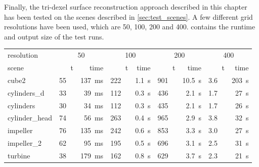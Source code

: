 Finally, the tri-dexel surface reconstruction approach described in this chapter has been tested on the scenes described in \cref{sec:test_scenes}.
A few different grid resolutions have been used, which are 50, 100, 200 and 400.
 contains the runtime and output size of the test runs.
%
\begin{table}
	\begin{subtable}{\textwidth}
		\centering
		\begin{tabular}{l|rr|rr|rr|rr}
			resolution     & \multicolumn{2}{c}{50} & \multicolumn{2}{c}{100} & \multicolumn{2}{c}{200} & \multicolumn{2}{c}{400} \\
			scene          & t\sub{out} & time & t\sub{out} & time & t\sub{out} & time & t\sub{out} & time \\
			\midrule
			cube2          & \SI{55}{\kilo\nothing} & \SI{137}{\milli\second} & \SI{222}{\kilo\nothing} & \SI{1.1}{\second} & \SI{901}{\kilo\nothing} & \SI{10.5}{\second} & \SI{3.6}{\mega\nothing} & \SI{203}{\second} \\
			cylinders\_d   & \SI{33}{\kilo\nothing} & \SI{ 39}{\milli\second} & \SI{112}{\kilo\nothing} & \SI{0.3}{\second} & \SI{436}{\kilo\nothing} & \SI{ 2.1}{\second} & \SI{1.7}{\mega\nothing} & \SI{ 27}{\second} \\
			cylinders      & \SI{30}{\kilo\nothing} & \SI{ 34}{\milli\second} & \SI{112}{\kilo\nothing} & \SI{0.3}{\second} & \SI{435}{\kilo\nothing} & \SI{ 2.1}{\second} & \SI{1.7}{\mega\nothing} & \SI{ 26}{\second} \\
			cylinder\_head & \SI{74}{\kilo\nothing} & \SI{ 56}{\milli\second} & \SI{263}{\kilo\nothing} & \SI{0.4}{\second} & \SI{965}{\kilo\nothing} & \SI{ 2.9}{\second} & \SI{3.8}{\mega\nothing} & \SI{ 32}{\second} \\
			impeller       & \SI{76}{\kilo\nothing} & \SI{135}{\milli\second} & \SI{242}{\kilo\nothing} & \SI{0.6}{\second} & \SI{853}{\kilo\nothing} & \SI{ 3.3}{\second} & \SI{3.0}{\mega\nothing} & \SI{ 27}{\second} \\
			impeller\_2    & \SI{62}{\kilo\nothing} & \SI{ 95}{\milli\second} & \SI{195}{\kilo\nothing} & \SI{0.5}{\second} & \SI{696}{\kilo\nothing} & \SI{ 3.1}{\second} & \SI{2.5}{\mega\nothing} & \SI{ 31}{\second} \\
			turbine        & \SI{38}{\kilo\nothing} & \SI{179}{\milli\second} & \SI{162}{\kilo\nothing} & \SI{0.8}{\second} & \SI{629}{\kilo\nothing} & \SI{ 3.7}{\second} & \SI{2.3}{\mega\nothing} & \SI{ 21}{\second} \\
		\end{tabular}

\end{subtable}
\end{table}
